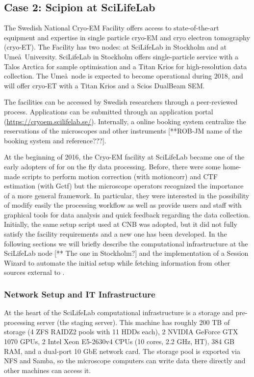 
\subsection{Case 2: Scipion at SciLifeLab}

The Swedish National Cryo-EM Facility offers access to state-of-the-art equipment and expertise in single particle cryo-EM and cryo electron tomography (cryo-ET). The Facility has two nodes: at SciLifeLab in Stockholm and at Ume\aa\ University. SciLifeLab in Stockholm offers single-particle service with a 
Talos Arctica for sample optimisation and a Titan Krios for high-resolution data collection. The Ume\aa\ node is expected to become operational during 2018, and will offer cryo-ET with a Titan Krios and a Scios DualBeam SEM.

The facilities can be accessed by Swedish researchers through 
a peer-reviewed process. Applications can be submitted through an application portal (\url{https://cryoem.scilifelab.se/}). %
Internally, a online booking system centralize the reservations of the microscopes and other instruments [**ROB-JM name of the booking system and reference???]. 

At the beginning of 2016, the Cryo-EM facility at SciLifeLab became one of the early adopters of \scipion for on the fly data processing. Before, there were some home-made scripts to perform motion correction (with motioncorr) and CTF estimation (with Gctf) but the microscope operators recognized the importance of a more general framework. In particular, they were interested in the possibility of modify easily the processing workflow as well as provide users and staff with  graphical tools for data analysis and quick feedback regarding the data collection. Initially, the same setup script used at CNB was adopted, but it did not fully satisfy the facility requirements and a new one has been developed. In the following sections we will briefly describe the computational infrastructure at the SciLifeLab node [** The one in  Stockholm?] and the implementation of a Session Wizard to automate the initial setup while fetching information from other sources external to \scipion. 

\subsubsection{Network Setup and IT Infrastructure}
At the heart of the SciLifeLab computational infrastructure is a storage and pre-processing server (the
staging server). This machine has roughly 200 TB of storage (4 ZFS RAIDZ2 pools
with 11 HDDs each), 2 NVIDIA GeForce GTX 1070 GPUs, 2 Intel Xeon E5-2630v4 CPUs
(10 cores, 2.2 GHz, HT), 384 GB RAM, and a dual-port 10 GbE network card. The
storage pool is exported via NFS and Samba, so the microscope computers can
write data there directly and other machines can access it.

